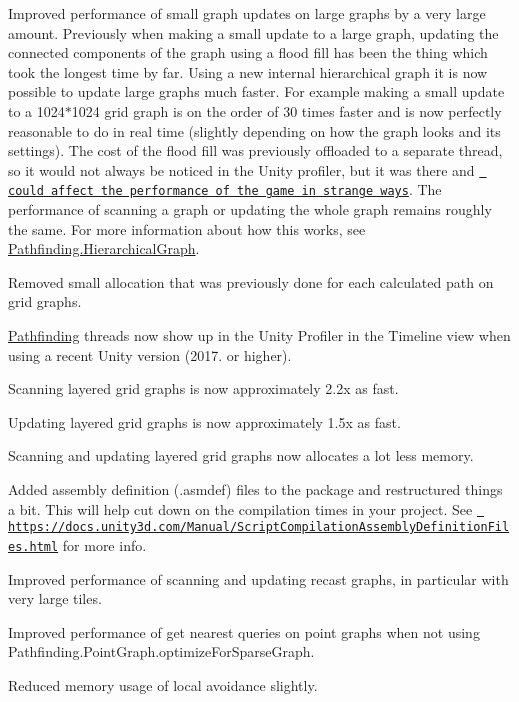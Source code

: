 \begin{DoxyItemize}
\begin{DoxyItemize}
\begin{DoxyItemize}
\item Improved performance of small graph updates on large graphs by a very large amount. Previously when making a small update to a large graph, updating the connected components of the graph using a flood fill has been the thing which took the longest time by far. Using a new internal hierarchical graph it is now possible to update large graphs much faster. For example making a small update to a 1024$\ast$1024 grid graph is on the order of 30 times faster and is now perfectly reasonable to do in real time (slightly depending on how the graph looks and its settings). The cost of the flood fill was previously offloaded to a separate thread, so it would not always be noticed in the Unity profiler, but it was there and \href{http://forum.arongranberg.com/t/updategraphs-lag-spikes}{\texttt{ could affect the performance of the game in strange ways}}. The performance of scanning a graph or updating the whole graph remains roughly the same. For more information about how this works, see \mbox{\hyperlink{class_pathfinding_1_1_hierarchical_graph}{Pathfinding.\+Hierarchical\+Graph}}.
\item Removed small allocation that was previously done for each calculated path on grid graphs.
\item \mbox{\hyperlink{namespace_pathfinding}{Pathfinding}} threads now show up in the Unity Profiler in the Timeline view when using a recent Unity version (2017. or higher).
\item Scanning layered grid graphs is now approximately 2.\+2x as fast.
\item Updating layered grid graphs is now approximately 1.\+5x as fast.
\item Scanning and updating layered grid graphs now allocates a lot less memory.
\item Added assembly definition (.asmdef) files to the package and restructured things a bit. This will help cut down on the compilation times in your project. See \href{https://docs.unity3d.com/Manual/ScriptCompilationAssemblyDefinitionFiles.html}{\texttt{ https\+://docs.\+unity3d.\+com/\+Manual/\+Script\+Compilation\+Assembly\+Definition\+Files.\+html}} for more info.
\item Improved performance of scanning and updating recast graphs, in particular with very large tiles.
\item Improved performance of get nearest queries on point graphs when not using Pathfinding.\+Point\+Graph.\+optimize\+For\+Sparse\+Graph.
\item Reduced memory usage of local avoidance slightly.

\end{DoxyItemize}
\end{DoxyItemize}
\end{DoxyItemize}
